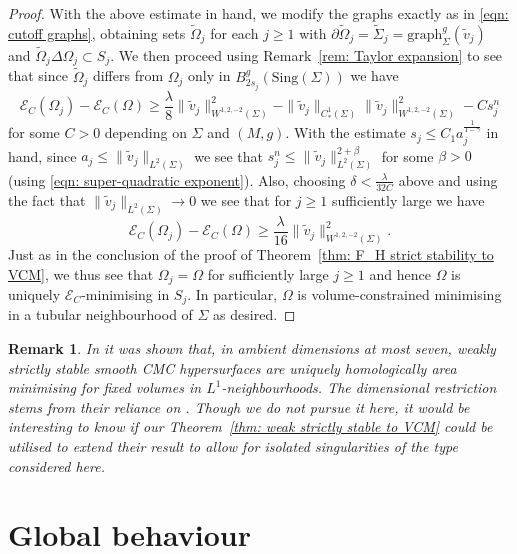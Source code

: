 \documentclass[12pt]{article}
\newtheorem{remark}{Remark}
\begin{document}
\begin{proof}
With the above estimate in hand, we modify the graphs exactly as in \eqref{eqn: cutoff graphs}, obtaining sets $\widetilde{\Omega}_j$ for each $j \geq 1$ with $\partial \widetilde{\Omega}_j = \widetilde{\Sigma}_j = \mathrm{graph}_\Sigma^g(\widetilde{v}_j)$ and $\widetilde{\Omega}_j \Delta \Omega_j \subset S_j$. We then proceed using Remark~\ref{rem: Taylor expansion} to see that since $\widetilde{\Omega}_j$ differs from $\Omega_j$ only in $B_{2s_j}^g(\mathrm{Sing}(\Sigma))$ we have
$$\mathcal{E}_C(\Omega_j) - \mathcal{E}_C(\Omega) \geq \frac{\lambda}{8}\|\widetilde{v}_j\|_{W^{1,2,-2}(\Sigma)}^2 - \|\widetilde{v}_j\|_{C^1_*(\Sigma)}\|\widetilde{v}_j\|_{W^{1,2,-2}(\Sigma)}^2 - Cs_j^n$$
for some $C > 0$ depending on $\Sigma$ and $(M,g)$. With the estimate $s_j \leq C_1a_j^{\frac{1}{1-\gamma}}$ in hand, since $a_j \leq \|\widetilde{v}_j\|_{L^2(\Sigma)}$ we see that $s_j^n \leq \|\widetilde{v}_j\|_{L^2(\Sigma)}^{2 + \beta}$ for some $\beta > 0$ (using \eqref{eqn: super-quadratic exponent}). Also, choosing $\delta < \frac{\lambda}{32C}$ above and using the fact that $\|\widetilde{v}_j\|_{L^2(\Sigma)} \rightarrow 0$ we see that for $j \geq 1$ sufficiently large we have
$$\mathcal{E}_C(\Omega_j) - \mathcal{E}_C(\Omega) \geq \frac{\lambda}{16}\|\widetilde{v}_j\|_{W^{1,2,-2}(\Sigma)}^2.$$
Just as in the conclusion of the proof of Theorem~\ref{thm: F_H strict stability to VCM}, we thus see that $\Omega_j = \Omega$ for sufficiently large $j \geq 1$ and hence $\Omega$ is uniquely $\mathcal{E}_C$-minimising in $S_j$. In particular, $\Omega$ is volume-constrained minimising in a tubular neighbourhood of $\Sigma$ as desired.
\end{proof}

\begin{remark}
    In \cite{MR10} it was shown that, in ambient dimensions at most seven, weakly strictly stable smooth CMC hypersurfaces are uniquely homologically area minimising for fixed volumes in $L^1$-neighbourhoods. The dimensional restriction stems from their reliance on \cite[Proposition 1]{MR10}. Though we do not pursue it here, it would be interesting to know if our Theorem~\ref{thm: weak strictly stable to VCM} could be utilised to extend their result to allow for isolated singularities of the type considered here.
\end{remark}


\section{Global behaviour}\label{sec: global behaviour}
\end{document}
